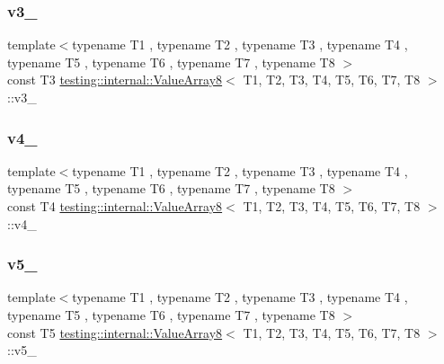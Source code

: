 \subsubsection{\texorpdfstring{v3\_}{v3\_}}
{\footnotesize\ttfamily template$<$typename T1 , typename T2 , typename T3 , typename T4 , typename T5 , typename T6 , typename T7 , typename T8 $>$ \\
const T3 \mbox{\hyperlink{classtesting_1_1internal_1_1_value_array8}{testing\+::internal\+::\+Value\+Array8}}$<$ T1, T2, T3, T4, T5, T6, T7, T8 $>$\+::v3\+\_\+\hspace{0.3cm}{\ttfamily [private]}}

\mbox{\label{classtesting_1_1internal_1_1_value_array8_a2cfe2503edafbbc51fa07a7afa8b3986}} 
\subsubsection{\texorpdfstring{v4\_}{v4\_}}
{\footnotesize\ttfamily template$<$typename T1 , typename T2 , typename T3 , typename T4 , typename T5 , typename T6 , typename T7 , typename T8 $>$ \\
const T4 \mbox{\hyperlink{classtesting_1_1internal_1_1_value_array8}{testing\+::internal\+::\+Value\+Array8}}$<$ T1, T2, T3, T4, T5, T6, T7, T8 $>$\+::v4\+\_\+\hspace{0.3cm}{\ttfamily [private]}}

\mbox{\label{classtesting_1_1internal_1_1_value_array8_aecf7a5e8e3c13f7d7445bd354f763669}} 
\subsubsection{\texorpdfstring{v5\_}{v5\_}}
{\footnotesize\ttfamily template$<$typename T1 , typename T2 , typename T3 , typename T4 , typename T5 , typename T6 , typename T7 , typename T8 $>$ \\
const T5 \mbox{\hyperlink{classtesting_1_1internal_1_1_value_array8}{testing\+::internal\+::\+Value\+Array8}}$<$ T1, T2, T3, T4, T5, T6, T7, T8 $>$\+::v5\+\_\+\hspace{0.3cm}{\ttfamily [private]}}

